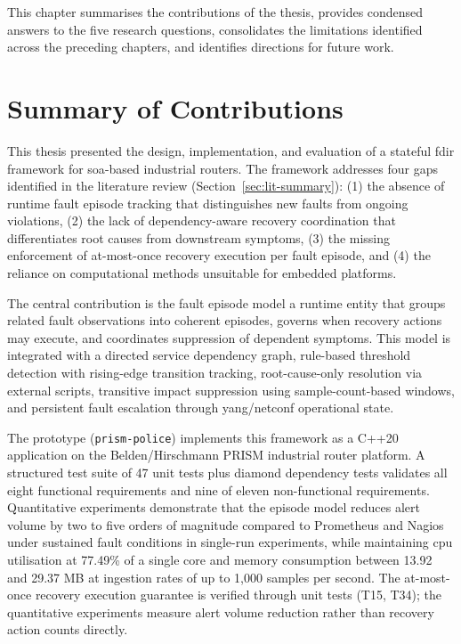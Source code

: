 This chapter summarises the contributions of the thesis, provides condensed answers to the five research questions, consolidates the limitations identified across the preceding chapters, and identifies directions for future work.

\section{Summary of Contributions}\label{sec:contributions}

This thesis presented the design, implementation, and evaluation of a stateful \gls{fdir} framework for \gls{soa}-based industrial routers. The framework addresses four gaps identified in the literature review (Section~\ref{sec:lit-summary}): (1) the absence of runtime fault episode tracking that distinguishes new faults from ongoing violations, (2) the lack of dependency-aware recovery coordination that differentiates root causes from downstream symptoms, (3) the missing enforcement of at-most-once recovery execution per fault episode, and (4) the reliance on computational methods unsuitable for embedded platforms.

The central contribution is the fault episode model a runtime entity that groups related fault observations into coherent episodes, governs when recovery actions may execute, and coordinates suppression of dependent symptoms. This model is integrated with a directed service dependency graph, rule-based threshold detection with rising-edge transition tracking, root-cause-only resolution via external scripts, transitive impact suppression using sample-count-based windows, and persistent fault escalation through \gls{yang}/\gls{netconf} operational state.

The prototype (\texttt{prism-police}) implements this framework as a C++20 application on the Belden\allowbreak/\allowbreak Hirschmann PRISM industrial router platform. A structured test suite of 47 unit tests plus diamond dependency tests validates all eight functional requirements and nine of eleven non-functional requirements. Quantitative experiments demonstrate that the episode model reduces alert volume by two to five orders of magnitude compared to Prometheus and Nagios under sustained fault conditions in single-run experiments, while maintaining \gls{cpu} utilisation at 77.49\% of a single core and memory consumption between 13.92 and 29.37 MB at ingestion rates of up to 1{,}000 samples per second. The at-most-once recovery execution guarantee is verified through unit tests (T15, T34); the quantitative experiments measure alert volume reduction rather than recovery action counts directly.

